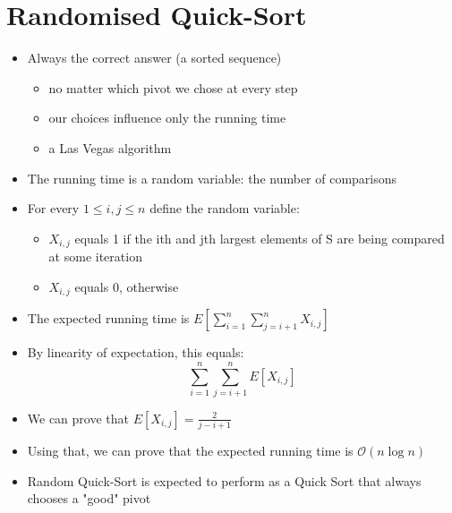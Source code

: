 \documentclass{article}[18pt]
\begin{document}
\section{Randomised Quick-Sort}
\begin{itemize}
	\item Always the correct answer (a sorted sequence)
	\begin{itemize}
		\item no matter which pivot we chose at every step
		\item our choices influence only the running time
		\item a Las Vegas algorithm
	\end{itemize}
	\item The running time is a random variable: the number of comparisons
	\item For every $1\leqslant i, j\leqslant n$ define the random variable:
	\begin{itemize}
		\item $X_{i,j}$ equals 1 if the ith and jth largest elements of S are being compared at some iteration
		\item $X_{i,j}$ equals 0, otherwise
	\end{itemize}
	\item The expected running time is $E \left[ \sum _ { i = 1 } ^ { n } \sum _ { j = i + 1 } ^ { n } X _ { i , j } \right]$
	\item By linearity of expectation, this equals:
	$$\sum _ { i = 1 } ^ { n } \sum _ { j = i + 1 } ^ { n } E \left[ X _ { i , j } \right]$$
	\item We can prove that $E \left[ X _ { i , j } \right] = \frac { 2 } { j - i + 1 }$
	\item Using that, we can prove that the expected running time is $\mathcal{O}(n\log n)$
	\item Random Quick-Sort is expected to perform as a Quick Sort that always chooses a "good" pivot
\end{itemize}
\end{document}
